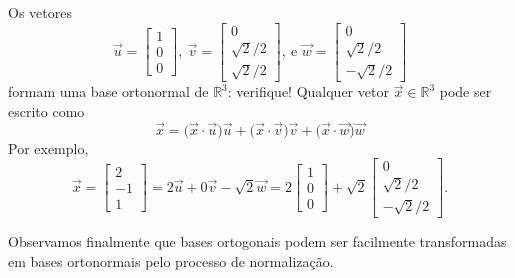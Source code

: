 \begin{ex}
	Os vetores
	\begin{equation}
	\vec{u} =
	\begin{bmatrix}
	1 \\ 0 \\ 0
	\end{bmatrix}, \
	\vec{v} =
	\begin{bmatrix}
	0 \\ \sqrt{2}/2 \\ \sqrt{2}/2
	\end{bmatrix}, \ \text{e }
	\vec{w} =
	\begin{bmatrix}
	0 \\ \sqrt{2}/2 \\ - \sqrt{2}/2
	\end{bmatrix}
	\end{equation} formam uma base ortonormal de $\mathbb{R}^3$: verifique! Qualquer vetor $\vec{x} \in \mathbb{R}^3$ pode ser escrito como
	\begin{equation}
	\vec{x} = \big( \vec{x} \cdot \vec{u} \big) \vec{u} + \big( \vec{x} \cdot \vec{v} \big) \vec{v} + \big( \vec{x} \cdot \vec{w} \big) \vec{w}
	\end{equation} Por exemplo,
	\begin{equation}
	\vec{x} =
	\begin{bmatrix}
	2 \\ -1 \\ 1
	\end{bmatrix} = 2 \vec{u} + 0 \vec{v} - \sqrt{2} \vec{w} = 2
	\begin{bmatrix}
	1 \\ 0 \\ 0
	\end{bmatrix} + \sqrt{2}
	\begin{bmatrix}
	0 \\ \sqrt{2}/2 \\ - \sqrt{2}/2
	\end{bmatrix}.
	\end{equation}
\end{ex}


Observamos finalmente que bases ortogonais podem ser facilmente transformadas em bases ortonormais pelo processo de normalização.


